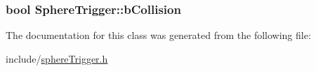 \subsubsection[{\texorpdfstring{b\+Collision}{bCollision}}]{\setlength{\rightskip}{0pt plus 5cm}bool Sphere\+Trigger\+::b\+Collision\hspace{0.3cm}{\ttfamily [private]}}\hypertarget{class_sphere_trigger_aa2bbb652a3072e2041c75c01705486b9}{}\label{class_sphere_trigger_aa2bbb652a3072e2041c75c01705486b9}


The documentation for this class was generated from the following file\+:\begin{DoxyCompactItemize}
\item 
include/\hyperlink{sphere_trigger_8h}{sphere\+Trigger.\+h}\end{DoxyCompactItemize}
